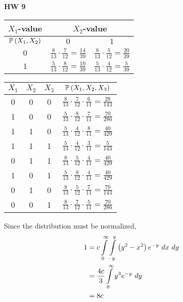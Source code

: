 \documentclass{article}
\begin{document}
\begin{center}
  \Large \textbf{HW 9}
\end{center}

\setcounter{problem}{1}
\problem{}
\subproblema{}


\begin{center}
  \begin{tabular}{ |c|c|c| }
    \hline
    $X_1$-value & \multicolumn{2}{c|}{$X_2$-value} \\
    \hline
    $\mathbb{P} \left ( X_1, X_2 \right)$ & $0$ & $1$ \\
    \hline
    $0$ & $\frac{8}{13} \cdot \frac{7}{12} = \frac{14}{39}$ & $\frac{8}{13} \cdot \frac{5}{12} = \frac{20}{39}$ \\
    $1$ & $\frac{5}{13} \cdot \frac{8}{12} = \frac{10}{39}$ & $\frac{5}{13} \cdot \frac{4}{12} = \frac{5}{39}$ \\
    \hline
  \end{tabular}
\end{center}

\subproblema{}
\begin{center}
  \begin{tabular}{|c|c|c|c|}
    \hline
    $X_1$ & $X_2$ & $X_3$ & $\mathbb{P} \left ( X_1, X_2, X_3 \right)$ \\
    \hline
    0 & 0 & 0 & $\frac{8}{13} \cdot \frac{7}{12} \cdot \frac{6}{11} = \frac{28}{143}$ \\
    1 & 0 & 0 & $\frac{5}{13} \cdot \frac{8}{12} \cdot \frac{7}{11} = \frac{70}{286}$ \\
    1 & 1 & 0 & $\frac{5}{13} \cdot \frac{4}{12} \cdot \frac{8}{11} = \frac{40}{429}$ \\
    1 & 1 & 1 & $\frac{5}{13} \cdot \frac{4}{12} \cdot \frac{3}{11} = \frac{5}{143}$ \\
    0 & 1 & 1 & $\frac{8}{13} \cdot \frac{5}{12} \cdot \frac{4}{11} = \frac{40}{429}$ \\
    1 & 0 & 1 & $\frac{5}{13} \cdot \frac{8}{12} \cdot \frac{4}{11} = \frac{40}{429}$ \\
    0 & 1 & 0 & $\frac{8}{13} \cdot \frac{5}{12} \cdot \frac{7}{11} = \frac{70}{143}$ \\
    0 & 0 & 1 & $\frac{8}{13} \cdot \frac{7}{12} \cdot \frac{5}{11} = \frac{70}{286}$ \\
    \hline
  \end{tabular}
\end{center}


\setcounter{problem}{7}
\problem{}

\subproblema{}
Since the distribution must be normalized,
\begin{align*}
  1 &= c \int \limits_{0}^{\infty} \int \limits_{-y}^{y} \left (y^2 - x^2 \right) e^{-y}\ dx\ dy \\
    &= \frac{4c}{3} \int \limits_{0}^{\infty} y^3 e^{-y}\ dy \\
    &= 8c \\
\end{align*}
\end{document}
